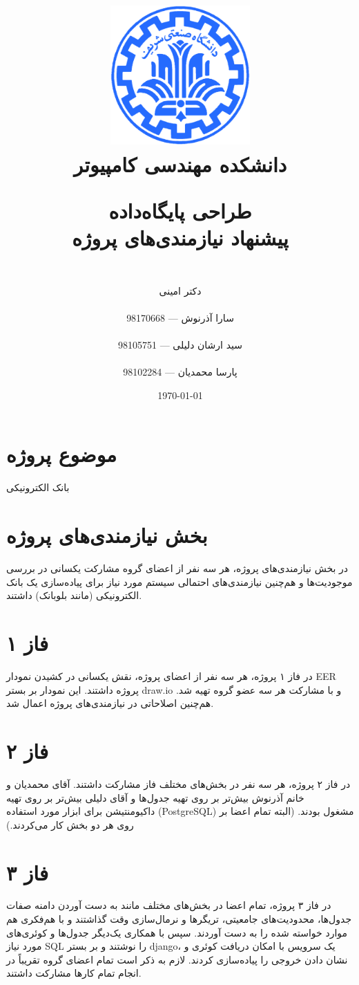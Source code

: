 \documentclass{article}
\title{
\includegraphics[width=0.4\textwidth]{sharif.png}\\
\normalsize{دانشکده مهندسی کامپیوتر}\\
\vspace{1cm}
	
\huge{طراحی پایگاه‌داده}
\\ \vspace{.8cm}
\Large{پیشنهاد نیازمندی‌های پروژه}
}
\author{
\\
دکتر امینی
\\ \vspace{.4cm}
\\
  سارا آذرنوش       ---      98170668
\\ \vspace{0.2cm} \\
  سید ارشان دلیلی       ---      98105751
\\ \vspace{0.2cm} \\
  پارسا محمدیان       ---      98102284
\\ \vspace{.4cm}
}
\date{\today}
\begin{document}
\clearpage
\maketitle
\thispagestyle{empty}

\newpage

\clearpage
\pagestyle{fancy}


\tableofcontents

\newpage

\setcounter{page}{1}

\section{موضوع پروژه}
بانک الکترونیکی

\section{بخش نیازمندی‌های پروژه}
در بخش نیازمندی‌های پروژه، هر سه نفر از اعضای گروه مشارکت یکسانی در بررسی موجودیت‌ها و هم‌چنین نیازمندی‌های احتمالی سیستم مورد نیاز برای پیاده‌سازی یک بانک الکترونیکی (مانند بلوبانک) داشتند.

\section{فاز ۱}
در فاز ۱ پروژه، هر سه نفر از اعضای پروژه، نقش یکسانی در کشیدن نمودار EER پروژه داشتند. این نمودار بر بستر draw.io و با مشارکت هر سه عضو گروه تهیه شد. هم‌چنین اصلاحاتی در نیازمندی‌های پروژه اعمال شد.

\section{فاز ۲}
در فاز ۲ پروژه، هر سه نفر در بخش‌های مختلف فاز مشارکت داشتند. آقای محمدیان و خانم آذرنوش بیش‌تر بر روی تهیه جدول‌ها و آقای دلیلی بیش‌تر بر روی تهیه داکیومنتیشن برای ابزار مورد استفاده (PostgreSQL) مشغول بودند. (البته تمام اعضا بر روی هر دو بخش کار می‌کردند.)

\section{فاز ۳}

در فاز ۳ پروژه، تمام اعضا در بخش‌های مختلف مانند به دست آوردن دامنه صفات جدول‌ها، محدودیت‌های جامعیتی، تریگرها و نرمال‌سازی وقت گذاشتند و با هم‌فکری هم موارد خواسته شده را به دست آوردند. سپس با همکاری یک‌دیگر جدول‌ها و کوئری‌های مورد نیاز SQL را نوشتند و بر بستر django، یک سرویس با امکان دریافت کوئری و نشان دادن خروجی را پیاده‌سازی کردند. لازم به ذکر است تمام اعضای گروه تقریباً در انجام تمام کارها مشارکت داشتند.
\end{document}
